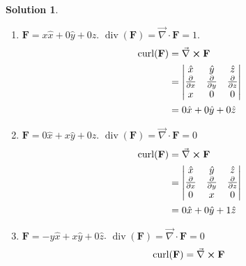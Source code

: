 \documentclass[10pt]{article}
\theoremstyle{definition}
\newtheorem{soln}{Solution}
\newcommand{\ux}{\hat{x}}
\newcommand{\uy}{\hat{y}}
\newcommand{\uz}{\hat{z}}
\DeclareMathOperator{\Div}{div}
\DeclareMathOperator{\Curl}{curl}
\begin{document}
\begin{soln}
  \begin{enumerate}[label=(\alph*)]
    \item $\mathbf{F}=x\ux+0\uy+0\uz$.
          $\Div(\mathbf{F})=\vec{\nabla} \cdot \mathbf{F}=1$.
          \begin{align*}
            \Curl(\mathbf{F}) & =\vec{\nabla} \cross \mathbf{F}                                                          \\
                              & =\begin{vmatrix}
                                   \ux                         & \uy                         & \uz                         \\
                                   \frac{\partial}{\partial x} & \frac{\partial}{\partial y} & \frac{\partial}{\partial z} \\
                                   x                           & 0                           & 0
                                 \end{vmatrix} \\
                              & = 0\ux + 0\uy+0\uz
          \end{align*}
    \item $\mathbf{F}=0\ux+x\uy+0\uz$. $\Div(\mathbf{F})=\vec{\nabla} \cdot \mathbf{F}=0$
          \begin{align*}
            \Curl(\mathbf{F}) & =\vec{\nabla} \cross \mathbf{F}                                                          \\
                              & =\begin{vmatrix}
                                   \ux                         & \uy                         & \uz                         \\
                                   \frac{\partial}{\partial x} & \frac{\partial}{\partial y} & \frac{\partial}{\partial z} \\
                                   0                           & x                           & 0
                                 \end{vmatrix} \\
                              & = 0\ux + 0\uy+ 1\uz
          \end{align*}
    \item $\mathbf{F}=-y\ux+x\uy+0\uz$. $\Div(\mathbf{F})=\vec{\nabla} \cdot \mathbf{F}=0$
          \begin{align*}
            \Curl(\mathbf{F}) & =\vec{\nabla} \cross \mathbf{F}                                                           \\

\end{align*}
\end{enumerate}
\end{soln}
\end{document}
